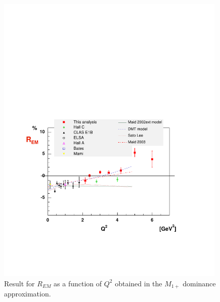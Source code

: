 \begin{figure}[h]
 \begin{center}
 \includegraphics[width = 11cm, bb=30 130 520 500]{analysis/img/RM} 
  \caption[Result for $R_{EM}$ as a function of $Q^2$]
          {  Result for $R_{EM}$ as a function of $Q^2$ obtained in the $M_{1+}$ dominance approximation.}
 \label{fig:RM}
\end{center}
\end{figure}



